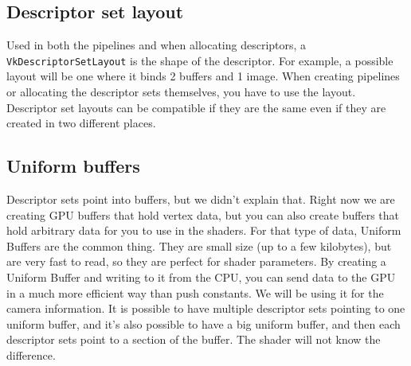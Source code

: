 \documentclass[12pt]{article}
\begin{document}
	\subsection{Descriptor set layout}
	Used in both the pipelines and when allocating descriptors, a \texttt{VkDescriptorSetLayout} is the shape of the descriptor. For example, a possible layout will be one where it binds 2 buffers and 1 image. When creating pipelines or allocating the descriptor sets themselves, you have to use the layout. Descriptor set layouts can be compatible if they are the same even if they are created in two different places.

	\subsection{Uniform buffers}
	Descriptor sets point into buffers, but we didn't explain that. Right now we are creating GPU buffers that hold vertex data, but you can also create buffers that hold arbitrary data for you to use in the shaders. For that type of data, Uniform Buffers are the common thing. They are small size (up to a few kilobytes), but are very fast to read, so they are perfect for shader parameters. By creating a Uniform Buffer and writing to it from the CPU, you can send data to the GPU in a much more efficient way than push constants. We will be using it for the camera information. It is possible to have multiple descriptor sets pointing to one uniform buffer, and it's also possible to have a big uniform buffer, and then each descriptor sets point to a section of the buffer. The shader will not know the difference.
\end{document}
